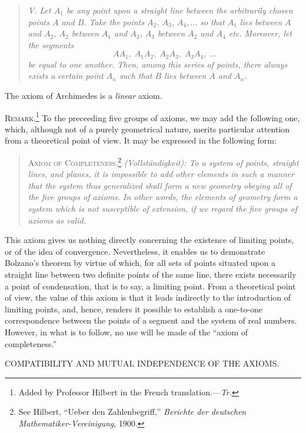 \documentclass[11pt,oneside]{book}
\begin{document}
\begin{quote}\emph{V. Let $A_1$ be any point upon a straight line between
the arbitrarily chosen points $A$ and $B$. Take the
points $A_2$, $A_3$, $A_4,\ldots$ so that $A_1$ lies between $A$
and $A_2$, $A_2$ between $A_1$ and $A_3$, $A_3$ between $A_2$ and
$A_4$ etc. Moreover, let the segments
\[
  A A_1, \; A_1 A_2, \; A_2 A_3, \; A_3 A_4, \;\ldots
\]
be equal to one another. Then, among this series
of points, there always exists a certain point $A_n$
such that $B$ lies between $A$ and $A_n$.}
\end{quote}

The axiom of Archimedes is a \emph{linear} axiom.

{\scshape Remark}.\footnote{Added
by Professor Hilbert in the French translation.---\textit{Tr.}}
To the preceeding five groups of axioms,
we may add the following one, which, although
not of a purely geometrical nature, merits particular
attention from a theoretical point of view. It may be
expressed in the following form:

\begin{quote}
{\scshape Axiom of Completeness}.\footnote{See Hilbert,
``Ueber den Zahlenbegriff,'' \textit{Berichte der deutschen Mathematiker-Vereinigung},
1900.}
\emph{(Vollst\"andigkeit): To a
system of points, straight lines, and planes, it is
impossible to add other elements in such a manner
that the system thus generalized shall form a new
geometry obeying all of the five groups of axioms.
In other words, the elements of geometry form a
system which is not susceptible of extension, if we
regard the five groups of axioms as valid.}
\end{quote}

This axiom gives us nothing directly concerning
the existence of limiting points, or of the idea of convergence.
Nevertheless, it enables us to demonstrate
Bolzano's theorem by virtue of which, for all sets of
points situated upon a straight line between two definite
points of the same line, there exists necessarily
a point of condensation, that is to say, a limiting point.
From a theoretical point of view, the value of this
axiom is that it leads indirectly to the introduction
of limiting points, and, hence, renders it possible to
establish a one-to-one correspondence between the
points of a segment and the system of real numbers.
However, in what is to follow, no use will be made of
the ``axiom of completeness.''
\newpage
\begin{center}{\Large COMPATIBILITY AND MUTUAL INDEPENDENCE OF THE AXIOMS.}\end{center}
\label{p9}
\end{document}
